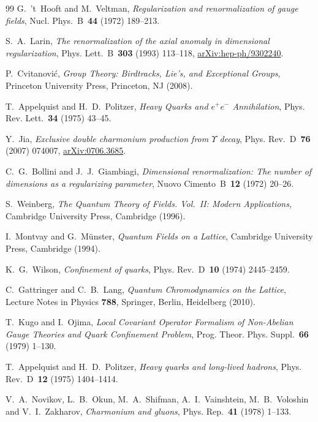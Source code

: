 \documentclass[UTF8,a4paper,11pt,fontset=fandol]{ctexart}
\theoremstyle{cplain}
\theoremstyle{cdefinition}
\theoremstyle{cremark}
\numberwithin{equation}{section}
\begin{document}
\begin{thebibliography}{99}
G.~'t~Hooft and M.~Veltman, \emph{Regularization and renormalization of gauge fields}, Nucl. Phys.~B~\textbf{44} (1972) \mbox{189--213}.

S.~A.~Larin, \emph{The renormalization of the axial anomaly in dimensional regularization}, Phys. Lett.~B~\textbf{303} (1993) \mbox{113--118}, \href{https://arxiv.org/abs/hep-ph/9302240}{arXiv:hep-ph/9302240}.

P.~Cvitanović, \emph{Group Theory: Birdtracks, Lie's, and Exceptional Groups}, Princeton University Press, Princeton, NJ (2008).

T.~Appelquist and H.~D.~Politzer, \emph{Heavy Quarks and $e^+e^-$ Annihilation}, Phys. Rev. Lett.~\textbf{34} (1975) \mbox{43--45}.

Y.~Jia, \emph{Exclusive double charmonium production from $\Upsilon$ decay}, Phys. Rev.~D~\textbf{76} (2007) \mbox{074007}, \href{https://arxiv.org/abs/0706.3685}{arXiv:0706.3685}.

C.~G.~Bollini and J.~J.~Giambiagi, \emph{Dimensional renormalization: The number of dimensions as a regularizing parameter}, Nuovo Cimento~B~\textbf{12} (1972) \mbox{20--26}.

S.~Weinberg, \emph{The Quantum Theory of Fields. Vol.~II: Modern Applications}, Cambridge University Press, Cambridge (1996).

I.~Montvay and G.~Münster, \emph{Quantum Fields on a Lattice}, Cambridge University Press, Cambridge (1994).

K.~G.~Wilson, \emph{Confinement of quarks}, Phys. Rev.~D~\textbf{10} (1974) \mbox{2445--2459}.

C.~Gattringer and C.~B.~Lang, \emph{Quantum Chromodynamics on the Lattice}, Lecture Notes in Physics \textbf{788}, Springer, Berlin, Heidelberg (2010).

T.~Kugo and I.~Ojima, \emph{Local Covariant Operator Formalism of Non-Abelian Gauge Theories and Quark Confinement Problem}, Prog. Theor. Phys. Suppl.~\textbf{66} (1979) \mbox{1--130}.

T.~Appelquist and H.~D.~Politzer, \emph{Heavy quarks and long-lived hadrons}, Phys. Rev.~D~\textbf{12} (1975) \mbox{1404--1414}.

V.~A.~Novikov, L.~B.~Okun, M.~A.~Shifman, A.~I.~Vainshtein, M.~B.~Voloshin and V.~I.~Zakharov, \emph{Charmonium and gluons}, Phys. Rep.~\textbf{41} (1978) \mbox{1--133}.


\end{thebibliography}
\end{document}
